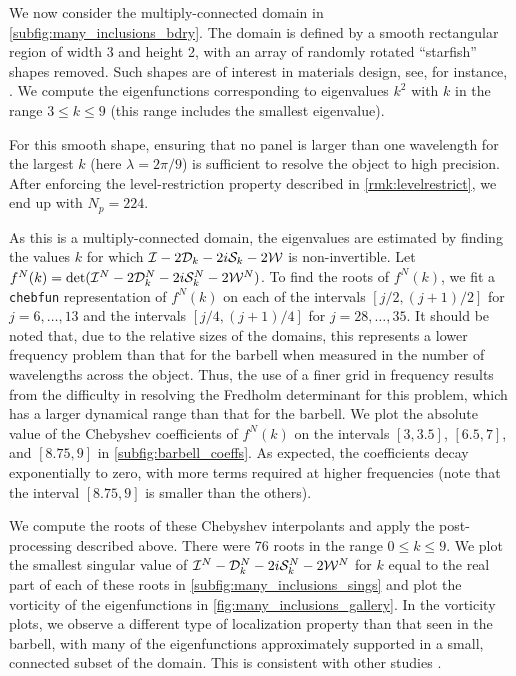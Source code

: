 We now consider the multiply-connected domain in
\cref{subfig:many_inclusions_bdry}.
% 
The domain is defined by a smooth rectangular region
of width 3 and height 2,
with an array of randomly rotated ``starfish'' shapes
removed. 
%
Such shapes are of interest in
materials design, see, for instance, \cite{overvelde2012compaction}.
%
We compute the eigenfunctions corresponding to
eigenvalues $k^2$ with $k$ in the range
$3 \leq k \leq 9$ (this range includes the smallest
eigenvalue).

%
For this smooth shape, ensuring that no panel is
larger than one wavelength for the largest $k$
(here $\lambda=2\pi/9$) is sufficient to resolve
the object to high precision.
%
After enforcing the
level-restriction property described in
\cref{rmk:levelrestrict}, we end up with
$N_p = 224$.

As this is a multiply-connected domain,
the eigenvalues are estimated by finding the values
$k$ for which $\mathcal I-2{\mathcal D}_{k}-2i{\mathcal S}_k-2{\mathcal W}$ is non-invertible.
%
Let $f^N(k) = \det (\mathcal I^N-2{\mathcal D}_{k}^N-2i{\mathcal S}_k^N-2{\mathcal W}^N)$.
To find the roots of $f^N(k)$, we fit a \texttt{chebfun}
representation of $f^N(k)$ on each of the intervals
$[j/2,(j+1)/2]$ for $j = 6,\ldots,13$ and the intervals
$[j/4,(j+1)/4]$ for $j = 28,\ldots,35$.
%
It should be noted that, due to the relative sizes
of the domains,
this represents a lower frequency problem than
that for the barbell when measured in the number
of wavelengths across the object.
%
Thus, the use of a finer grid in frequency results from
the difficulty in resolving the Fredholm determinant
for this problem, which has a larger dynamical range
than that for the barbell.
%
We plot the absolute value of the Chebyshev coefficients
of $f^N(k)$ on the intervals $[3,3.5]$, $[6.5,7]$,
and $[8.75,9]$ in \cref{subfig:barbell_coeffs}.
%
As expected, the coefficients decay exponentially
to zero, with more terms required at higher
frequencies (note that the interval $[8.75,9]$ is
smaller than the others).
%

We compute the roots of these Chebyshev interpolants
and apply the post-processing described above.
%
{\color{red} There were 76 roots in the range $0 \leq k \leq 9$.}
%
We plot the smallest singular value of
$\mathcal I^N-{\mathcal D}_{k}^N-2i{\mathcal S}_k^N-2{\mathcal W}^N$ for {\color{red}$k$ equal to the real part of}
each of these roots in
\cref{subfig:many_inclusions_sings}
and plot the vorticity of the eigenfunctions
in \cref{fig:many_inclusions_gallery}.
%
In the vorticity plots, we observe a different type of
localization property than that seen in the barbell,
with many of the eigenfunctions
approximately supported in a small, connected subset
of the domain. This is consistent with other studies
\cite{filoche2009strong,lindsay2018boundary}.

